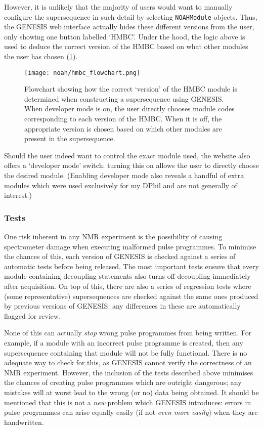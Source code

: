 However, it is unlikely that the majority of users would want to manually configure the supersequence in such detail by selecting \texttt{NOAHModule} objects.
Thus, the GENESIS web interface actually hides these different versions from the user, only showing one button labelled `HMBC'.
Under the hood, the logic above is used to deduce the correct version of the HMBC based on what other modules the user has chosen (\cref{fig:hmbc_flowchart}).

\begin{figure}[htb]
    \centering
    \texttt{[image: noah/hmbc\_flowchart.png]}%
    \caption[Flowchart for choosing HMBC module version]{
        Flowchart showing how the correct `version' of the HMBC module is determined when constructing a supersequence using GENESIS.
        When developer mode is on, the user directly chooses module codes corresponding to each version of the HMBC.
        When it is off, the appropriate version is chosen based on which other modules are present in the supersequence.
    }
    \label{fig:hmbc_flowchart}
\end{figure}

Should the user indeed want to control the exact module used, the website also offers a `developer mode' switch: turning this on allows the user to directly choose the desired module.
(Enabling developer mode also reveals a handful of extra modules which were used exclusively for my DPhil and are not generally of interest.)


\subsubsection{Tests}

One risk inherent in any NMR experiment is the possibility of causing spectrometer damage when executing malformed pulse programmes.
To minimise the chances of this, each version of GENESIS is checked against a series of automatic tests before being released.
The most important tests ensure that every module containing decoupling statements also turns off decoupling immediately after acquisition.
On top of this, there are also a series of regression tests where (some representative) supersequences are checked against the same ones produced by previous versions of GENESIS: any differences in these are automatically flagged for review.

None of this can actually \textit{stop} wrong pulse programmes from being written.
For example, if a module with an incorrect pulse programme is created, then any supersequence containing that module will not be fully functional.
There is no adequate way to check for this, as GENESIS cannot verify the correctness of an NMR experiment.
However, the inclusion of the tests described above minimises the chances of creating pulse programmes which are outright dangerous; any mistakes will at worst lead to the wrong (or no) data being obtained.
It should be mentioned that this is not a \textit{new} problem which GENESIS introduces: errors in pulse programmes can arise equally easily (if not \textit{even more easily}) when they are handwritten.



